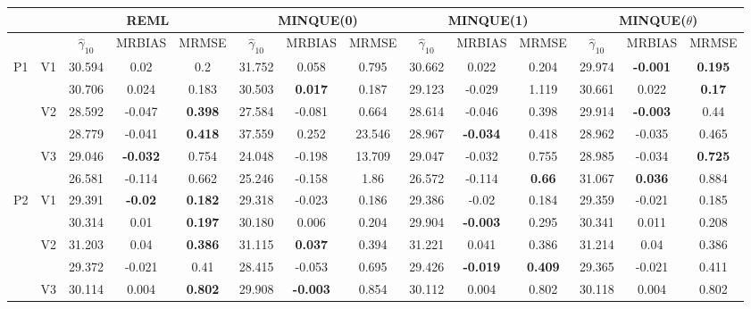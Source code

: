 \documentclass[12pt,a4paper]{article}
\begin{document}
\begin{sidewaystable}[ht]
\centering
{\footnotesize
\begin{tabular}{cc|ccc|ccc|ccc|ccc|}
   & & \multicolumn{3}{c|}{REML}&\multicolumn{3}{c|}{MINQUE(0)}&\multicolumn{3}{c|}{MINQUE(1)}&\multicolumn{3}{c|}{MINQUE($\theta$)}\\ \hline
 &  & $\hat{\gamma}_{10}$ & MRBIAS & MRMSE & $\hat{\gamma}_{10}$ & MRBIAS & MRMSE & $\hat{\gamma}_{10}$ & MRBIAS & MRMSE & $\hat{\gamma}_{10}$ & MRBIAS & MRMSE \\ 
  \hline
\multirow{6}{*}{P1} & \multirow{2}{*}{V1} & 30.594 & 0.02 & 0.2 & 31.752 & 0.058 & 0.795 & 30.662 & 0.022 & 0.204 & 29.974 & \textbf{-0.001} & \textbf{0.195} \\ 
   &  & 30.706 & 0.024 & 0.183 & 30.503 & \textbf{0.017} & 0.187 & 29.123 & -0.029 & 1.119 & 30.661 & 0.022 & \textbf{0.17} \\ 
   & \multirow{2}{*}{V2} & 28.592 & -0.047 & \textbf{0.398} & 27.584 & -0.081 & 0.664 & 28.614 & -0.046 & 0.398 & 29.914 & \textbf{-0.003} & 0.44 \\ 
   &  & 28.779 & -0.041 & \textbf{0.418} & 37.559 & 0.252 & 23.546 & 28.967 & \textbf{-0.034} & 0.418 & 28.962 & -0.035 & 0.465 \\ 
   & \multirow{2}{*}{V3} & 29.046 & \textbf{-0.032} & 0.754 & 24.048 & -0.198 & 13.709 & 29.047 & -0.032 & 0.755 & 28.985 & -0.034 & \textbf{0.725} \\ 
   &  & 26.581 & -0.114 & 0.662 & 25.246 & -0.158 & 1.86 & 26.572 & -0.114 & \textbf{0.66} & 31.067 & \textbf{0.036} & 0.884 \\ 
   \hline \hline\multirow{6}{*}{P2} & \multirow{2}{*}{V1} & 29.391 & \textbf{-0.02} & \textbf{0.182} & 29.318 & -0.023 & 0.186 & 29.386 & -0.02 & 0.184 & 29.359 & -0.021 & 0.185 \\ 
   &  & 30.314 & 0.01 & \textbf{0.197} & 30.180 & 0.006 & 0.204 & 29.904 & \textbf{-0.003} & 0.295 & 30.341 & 0.011 & 0.208 \\ 
   & \multirow{2}{*}{V2} & 31.203 & 0.04 & \textbf{0.386} & 31.115 & \textbf{0.037} & 0.394 & 31.221 & 0.041 & 0.386 & 31.214 & 0.04 & 0.386 \\ 
   &  & 29.372 & -0.021 & 0.41 & 28.415 & -0.053 & 0.695 & 29.426 & \textbf{-0.019} & \textbf{0.409} & 29.365 & -0.021 & 0.411 \\ 
   & \multirow{2}{*}{V3} & 30.114 & 0.004 & \textbf{0.802} & 29.908 & \textbf{-0.003} & 0.854 & 30.112 & 0.004 & 0.802 & 30.118 & 0.004 & 0.802 \\ 

\end{tabular}}
\end{sidewaystable}
\end{document}
